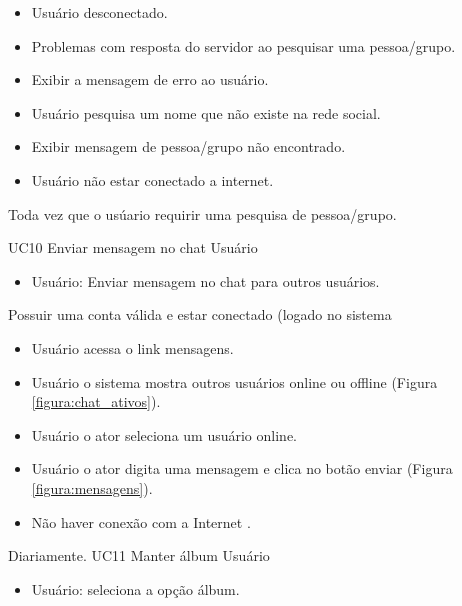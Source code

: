 {
\begin{itemize}
	\item Usuário desconectado.
	\item Problemas com resposta do servidor ao pesquisar uma pessoa/grupo.
	\item Exibir a mensagem de erro ao usuário.
	\item Usuário pesquisa um nome que não existe na rede social.
	\item Exibir mensagem de pessoa/grupo não encontrado.
	\item Usuário não estar conectado a internet.
\end{itemize}
}
{Toda vez que o usúario requirir uma pesquisa de pessoa/grupo.}
{

}
\casoDeUso
{UC10}
{Enviar mensagem no chat}
{Usuário}
{
\begin{itemize}
	\item Usuário: Enviar mensagem no chat para outros usuários.
	
\end{itemize}

}
 {Possuir uma conta válida e estar conectado (logado no sistema}
{}
{
\begin{itemize}
	\item Usuário acessa o link mensagens.
	\item Usuário o sistema mostra outros usuários online ou offline (Figura \ref{figura:chat_ativos}).
	\item Usuário o ator seleciona um usuário online.
	\item Usuário o ator digita uma mensagem e clica no botão enviar (Figura \ref{figura:mensagens}).
\end{itemize}
}
{
\begin{itemize}
	\item Não haver conexão com a Internet .

\end{itemize}
}
{Diariamente.}
{
}
\casoDeUso
{UC11}
{Manter álbum}
{Usuário}
{
\begin{itemize}
	\item Usuário: seleciona a opção álbum.
	
\end{itemize}

}
